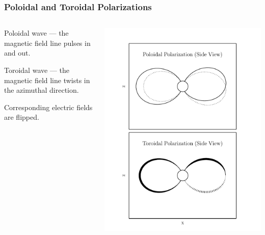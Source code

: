 \documentclass{beamer}
\begin{document}

\begin{frame}
\frametitle{Poloidal and Toroidal Polarizations}

\begin{columns}
\begin{wideitemize}
\item Poloidal wave --- the magnetic field line pulses in and out. 
\item Toroidal wave --- the magnetic field line twists in the azimuthal direction. 
\item Corresponding electric fields are flipped. 
\end{wideitemize}
\includegraphics[width=\textwidth]{figures/polarizations.pdf}
\end{columns}

\end{frame}
\end{document}
